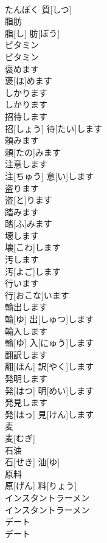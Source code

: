 \documentclass[8pt]{extreport}
\begin{document}
\begin{CJK}{UTF8}{min}
\\	たんぽく 質[しつ]		
\\	脂肪	
\\	脂[し] 肪[ぼう]		
\\	ビタミン	
\\	ビタミン		
\\	褒めます	
\\	褒[ほ]めます		
\\	しかります	
\\	しかります		
\\	招待します	
\\	招[しょう] 待[たい]します		
\\	頼みます	
\\	頼[たの]みます		
\\	注意します	
\\	注[ちゅう] 意[い]します		
\\	盗ります	
\\	盗[と]ります		
\\	踏みます	
\\	踏[ふ]みます		
\\	壊します	
\\	壊[こわ]します		
\\	汚します	
\\	汚[よご]します		
\\	行います	
\\	行[おこな]います		
\\	輸出します	
\\	輸[ゆ] 出[しゅつ]します		
\\	輸入します	
\\	輸[ゆ] 入[にゅう]します		
\\	翻訳します	
\\	翻[ほん] 訳[やく]します		
\\	発明します	
\\	発[はつ] 明[めい]します		
\\	発見します	
\\	発[はっ] 見[けん]します		
\\	麦	
\\	麦[むぎ]		
\\	石油	
\\	石[せき] 油[ゆ]		
\\	原料	
\\	原[げん] 料[りょう]		
\\	インスタントラーメン	
\\	インスタントラーメン		
\\	デート	
\\	デート		

\end{CJK}
\end{document}
